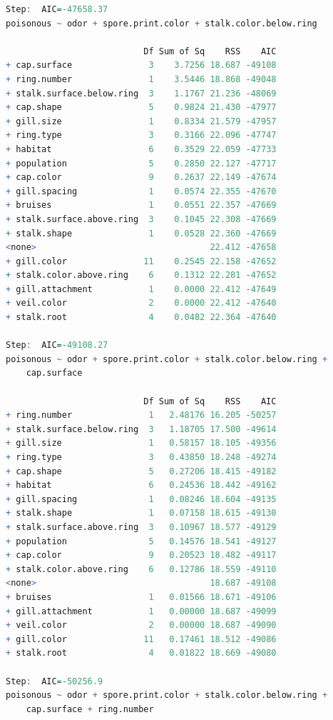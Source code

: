 \documentclass[12pt]{article}
\begin{document}
\begin{lstlisting}[language = R]
Step:  AIC=-47658.37
poisonous ~ odor + spore.print.color + stalk.color.below.ring

                           Df Sum of Sq    RSS    AIC
+ cap.surface               3    3.7256 18.687 -49108
+ ring.number               1    3.5446 18.868 -49048
+ stalk.surface.below.ring  3    1.1767 21.236 -48069
+ cap.shape                 5    0.9824 21.430 -47977
+ gill.size                 1    0.8334 21.579 -47957
+ ring.type                 3    0.3166 22.096 -47747
+ habitat                   6    0.3529 22.059 -47733
+ population                5    0.2850 22.127 -47717
+ cap.color                 9    0.2637 22.149 -47674
+ gill.spacing              1    0.0574 22.355 -47670
+ bruises                   1    0.0551 22.357 -47669
+ stalk.surface.above.ring  3    0.1045 22.308 -47669
+ stalk.shape               1    0.0528 22.360 -47669
<none>                                  22.412 -47658
+ gill.color               11    0.2545 22.158 -47652
+ stalk.color.above.ring    6    0.1312 22.281 -47652
+ gill.attachment           1    0.0000 22.412 -47649
+ veil.color                2    0.0000 22.412 -47640
+ stalk.root                4    0.0482 22.364 -47640

Step:  AIC=-49108.27
poisonous ~ odor + spore.print.color + stalk.color.below.ring + 
    cap.surface

                           Df Sum of Sq    RSS    AIC
+ ring.number               1   2.48176 16.205 -50257
+ stalk.surface.below.ring  3   1.18705 17.500 -49614
+ gill.size                 1   0.58157 18.105 -49356
+ ring.type                 3   0.43850 18.248 -49274
+ cap.shape                 5   0.27206 18.415 -49182
+ habitat                   6   0.24536 18.442 -49162
+ gill.spacing              1   0.08246 18.604 -49135
+ stalk.shape               1   0.07158 18.615 -49130
+ stalk.surface.above.ring  3   0.10967 18.577 -49129
+ population                5   0.14576 18.541 -49127
+ cap.color                 9   0.20523 18.482 -49117
+ stalk.color.above.ring    6   0.12786 18.559 -49110
<none>                                  18.687 -49108
+ bruises                   1   0.01566 18.671 -49106
+ gill.attachment           1   0.00000 18.687 -49099
+ veil.color                2   0.00000 18.687 -49090
+ gill.color               11   0.17461 18.512 -49086
+ stalk.root                4   0.01822 18.669 -49080

Step:  AIC=-50256.9
poisonous ~ odor + spore.print.color + stalk.color.below.ring + 
    cap.surface + ring.number


\end{lstlisting}
\end{document}
